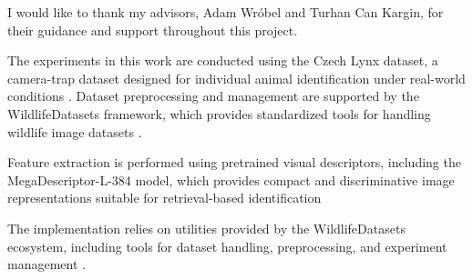 \documentclass{article}
\begin{document}
\begin{ack}
I would like to thank my advisors, Adam Wróbel and Turhan Can Kargin, for their guidance and support throughout this project.
\end{ack}

The experiments in this work are conducted using the Czech Lynx dataset, a camera-trap dataset designed for individual animal identification under real-world conditions \cite{czechlynx}. 
Dataset preprocessing and management are supported by the WildlifeDatasets framework, which provides standardized tools for handling wildlife image datasets \cite{Cermak_2024_WACV}.

Feature extraction is performed using pretrained visual descriptors, including the MegaDescriptor-L-384 model, which provides compact and discriminative image representations suitable for retrieval-based identification \cite{megadescriptor}

The implementation relies on utilities provided by the WildlifeDatasets ecosystem, including tools for dataset handling, preprocessing, and experiment management \cite{wildlifetools}.



\end{document}
